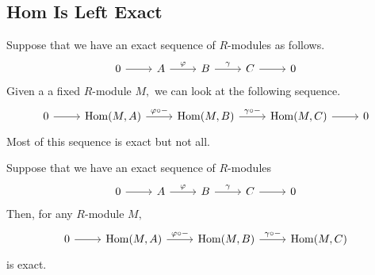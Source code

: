 \documentclass[../notes.tex]{subfiles}
\begin{document}
\subsection{Hom Is Left Exact}
Suppose that we have an exact sequence of $R$-modules as follows.
\[\begin{tikzcd}
	0 & A & B & C & 0
	\arrow[from=1-1, to=1-2]
	\arrow["\varphi", from=1-2, to=1-3]
	\arrow["\gamma", from=1-3, to=1-4]
	\arrow[from=1-4, to=1-5]
\end{tikzcd}\]
Given a a fixed $R$-module $M,$ we can look at the following sequence.
\[\begin{tikzcd}
	0 & {\operatorname{Hom}(M,A)} & {\operatorname{Hom}(M,B)} & {\operatorname{Hom}(M,C)} & 0
	\arrow[from=1-1, to=1-2]
	\arrow["{\varphi\circ-}", from=1-2, to=1-3]
	\arrow["{\gamma\circ-}", from=1-3, to=1-4]
	\arrow[from=1-4, to=1-5]
\end{tikzcd}\]
Most of this sequence is exact but not all.
\begin{proposition} \label{prop:homleft}
	Suppose that we have an exact sequence of $R$-modules
	\[\begin{tikzcd}
		0 & A & B & C & 0
		\arrow[from=1-1, to=1-2]
		\arrow["\varphi", from=1-2, to=1-3]
		\arrow["\gamma", from=1-3, to=1-4]
		\arrow[from=1-4, to=1-5]
	\end{tikzcd}\]
	Then, for any $R$-module $M,$
	\[\begin{tikzcd}
		0 & {\operatorname{Hom}(M,A)} & {\operatorname{Hom}(M,B)} & {\operatorname{Hom}(M,C)}
		\arrow[from=1-1, to=1-2]
		\arrow["{\varphi\circ-}", from=1-2, to=1-3]
		\arrow["{\gamma\circ-}", from=1-3, to=1-4]
	\end{tikzcd}\]
	is exact.
\end{proposition}
\end{document}
